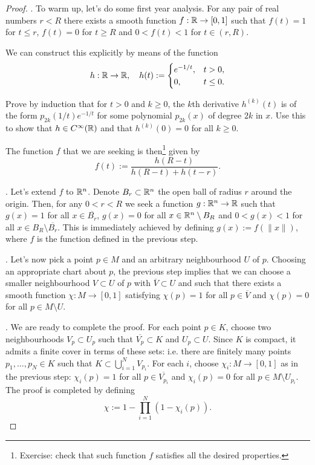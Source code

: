 \begin{proof}
  .
  To warm up, let's do some first year analysis.
  For any pair of real numbers $r < R$ there exists a smooth function $f: \mathbb{R} \to [0,1]$ such that $f(t) = 1$ for $t \leq r$, $f(t) = 0$ for $t \geq R$ and $0<f(t)<1$ for $t\in(r,R)$.
  
  We can construct this explicitly by means of the function
  \begin{equation}
    h:\mathbb{R}\to\mathbb{R}, \quad h(t):= \begin{cases}
      e^{-1/t}, & t>0,\\
      0, & t \leq 0.
    \end{cases}
  \end{equation}

  \begin{exercise}
    Prove by induction that for $t>0$ and $k\geq 0$, the $k$th derivative $h^{(k)}(t)$ is of the form $p_{2k}(1/t)e^{-1/t}$ for some polynomial $p_{2k}(x)$ of degree $2k$ in $x$.
    Use this to show that $h\in C^\infty(\mathbb{R})$ and that $h^{(k)}(0) = 0$ for all $k\geq 0$.
  \end{exercise}

  The function $f$ that we are seeking is then\footnote{Exercise: check that such function $f$ satisfies all the desired properties.} given by
  \begin{equation}
    f(t) := \frac{h(R-t)}{h(R-t) + h(t-r)}.
  \end{equation}

  .
  Let's extend $f$ to $\mathbb{R}^n$.
  Denote $B_r \subset \mathbb{R}^n$ the open ball of radius $r$ around the origin.
  Then, for any $0 < r < R$ we seek a function $g:\mathbb{R}^n\to\mathbb{R}$ such that $g(x) = 1$ for all $x\in \overline{B_r}$, $g(x) = 0$ for all $x\in \mathbb{R}^n\setminus B_R$ and $0< g(x)< 1$ for all $x\in B_R\setminus\overline{B_r}$.
  This is immediately achieved by defining $g(x) := f(\|x\|)$, where $f$ is the function defined in the previous step.

  .
  Let's now pick a point $p\in M$ and an arbitrary neighbourhood $U$ of $p$. Choosing an appropriate chart about $p$, the previous step implies that we can choose a smaller neighbourhood $V\subset U$ of $p$ with $\overline V\subset U$ and such that there exists a smooth function $\chi: M \to [0,1]$ satisfying $\chi(p) = 1$ for all $p\in\overline{V}$ and $\chi(p) = 0$ for all $p\in M\setminus U$.
  
  .
  We are ready to complete the proof.
  For each point $p\in K$, choose two neighbourhoods $V_p \subset U_p$ such that $\overline{V_p}\subset K$ and $U_p \subset U$.
  Since $K$ is compact, it admits a finite cover in terms of these sets: i.e. there are finitely many points $p_1, \ldots, p_N \in K$ such that $K \subset \bigcup_{i=1}^N V_{p_i}$.
  For each $i$, choose $\chi_i: M \to [0,1]$ as in the previous step: $\chi_i(p) = 1$ for all $p\in\overline{V_{p_i}}$ and $\chi_i(p) = 0$ for all $p\in M\setminus U_{p_i}$.
  The proof is completed by defining
  \begin{equation}
    \chi := 1 - \prod_{i=1}^N(1 - \chi_i(p)).
  \end{equation}
\end{proof}

